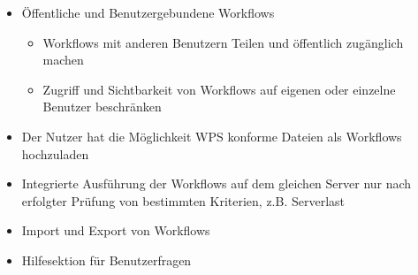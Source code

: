         \begin{itemize}
            \item Öffentliche und Benutzergebundene Workflows
			    \begin{itemize}
			        \item Workflows mit anderen Benutzern Teilen und öffentlich zugänglich machen
			        \item Zugriff und Sichtbarkeit von Workflows auf eigenen oder einzelne Benutzer beschränken
			    \end{itemize}
            \item Der Nutzer hat die Möglichkeit WPS konforme Dateien als Workflows hochzuladen
            
            \item Integrierte Ausführung der Workflows auf dem gleichen Server nur nach erfolgter Prüfung von bestimmten Kriterien, z.B. Serverlast
            \item Import und Export von Workflows
            \item Hilfesektion für Benutzerfragen
        \end{itemize}